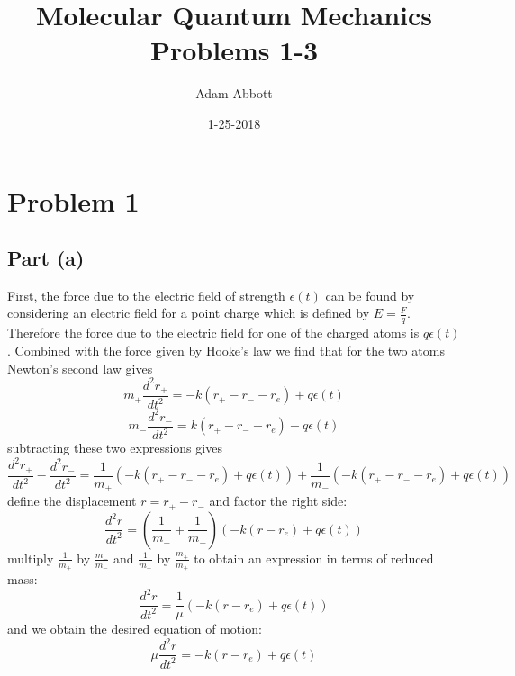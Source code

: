 \documentclass{article}
\title{Molecular Quantum Mechanics Problems 1-3}
\date{1-25-2018}
\author{Adam Abbott}
\begin{document}
\maketitle
\newpage
\section{Problem 1}
\subsection{Part (a)}
First, the force due to the electric field of strength $\epsilon(t)$ can be found by considering
an electric field for a point charge which is defined by $E = \frac{F}{q}$. Therefore the force
due to the electric field for one of the charged atoms is $q\epsilon(t)$. Combined with the force
given by Hooke's law we find that for the two atoms Newton's second law gives
\[m_+ \frac{d^2 r_+}{dt^2} = -k(r_+ - r_- - r_e) + q\epsilon(t)  \]
\[m_- \frac{d^2 r_-}{dt^2} =  k(r_+ - r_- - r_e) - q\epsilon(t)  \]
subtracting these two expressions gives
\[\frac{d^2 r_+}{dt^2} - \frac{d^2 r_-}{dt^2} = \frac{1}{m_+} (-k(r_+ - r_- - r_e) + q\epsilon(t)) + \frac{1}{m_-} (-k(r_+ - r_- - r_e) + q\epsilon(t))  \]
define the displacement $r = r_+ - r_-$ and factor the right side:
\[\frac{d^2 r}{dt^2} = (\frac{1}{m_+} + \frac{1}{m_-}) (-k(r - r_e) + q\epsilon(t)) \]
multiply $\frac{1}{m_+}$ by $\frac{m_-}{m_-}$ and $\frac{1}{m_-}$ by $\frac{m_+}{m_+}$ to obtain an expression in terms of reduced mass:
\[\frac{d^2 r}{dt^2} = \frac{1}{\mu}  (-k(r - r_e) + q\epsilon(t)) \]
and we obtain the desired equation of motion:
\[\mu \frac{d^2 r}{dt^2} = -k(r - r_e) + q\epsilon(t) \]
\end{document}
